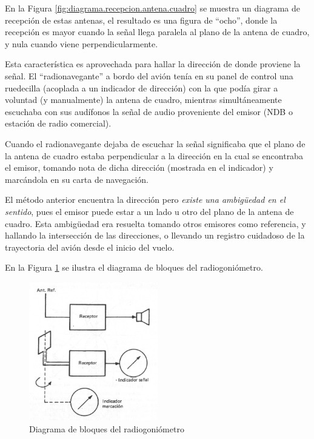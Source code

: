 En la Figura \ref{fig:diagrama.recepcion.antena.cuadro} se muestra un diagrama de recepci\'on de estas antenas, el resultado es una figura de ``ocho'', donde la recepci\'on es mayor cuando la se\~nal llega paralela al plano de la antena de cuadro, y nula cuando viene perpendicularmente.


Esta caracter\'istica es aprovechada para hallar la direcci\'on de donde proviene la se\~nal. El ``radionavegante'' a bordo del avi\'on ten\'ia en su panel de control una ruedecilla (acoplada a un indicador de direcci\'on) con la que pod\'ia girar a voluntad (y manualmente) la antena de cuadro, mientras simult\'aneamente escuchaba con sus aud\'ifonos la se\~nal de audio proveniente del emisor (NDB o estaci\'on de radio comercial).

Cuando el radionavegante dejaba de escuchar la se\~nal significaba que el plano de la antena de cuadro estaba perpendicular a la direcci\'on en la cual se encontraba el emisor, tomando nota de dicha direcci\'on (mostrada en el indicador) y marc\'andola en su carta de navegaci\'on.

El m\'etodo anterior encuentra la direcci\'on pero \emph{existe una ambigüedad en el sentido}, pues el emisor puede estar a un lado u otro del plano de la antena de cuadro. Esta ambigüedad era resuelta tomando otros emisores como referencia, y hallando la intersecci\'on de las direcciones, o llevando un registro cuidadoso de la trayectoria del avi\'on desde el inicio del vuelo.

En la Figura \ref{fig:diag-bloques-radiogoniometro} se ilustra el diagrama de bloques del radiogoni\'ometro.


\begin{figure}[!h]
  \centering
   \includegraphics[width=0.5\textwidth]{06.radionavegacion/Imagenes/06.01.adf/diag-bloques-radiogoniometro.png}
  \caption{Diagrama de bloques del radiogoni\'ometro}
  \label{fig:diag-bloques-radiogoniometro}
\end{figure}


